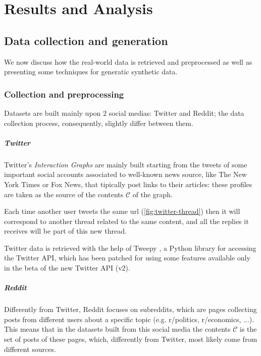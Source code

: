\chapter{Results and Analysis}
\label{ch:resultsAndAnalysis}

\section{Data collection and generation}%
\label{sec:data_collection_and_generation}

We now discuss how the real-world data is retrieved and preprocessed as well as
presenting some techniques for generatic synthetic data.

\subsection{Collection and preprocessing}%
\label{sub:collection_and_preprocessing}

Datasets are built mainly upon $2$ social medias: Twitter and Reddit; the data
collection process, consequently, slightly differ between them.

\paragraph{Twitter}%
\label{par:twitter-data}

Twitter's \emph{Interaction Graphs} are mainly built starting from the tweets
of some important social accounts associated to well-known news source, like The
New York Times or Fox News, that tipically post links to their articles:
these profiles are taken as the source of the contents $\mathcal{C} $ of the graph.

Each time another user tweets the same url (\autoref{fig:twitter-thread}) then
it will correspond to another thread related to the same content, and all the
replies it receives will be part of this new thread.

Twitter data is retrieved with the help of Tweepy \cite{tweepy}, a Python
library for accessing the Twitter API, which has been patched for using some
features available only in the beta of the new Twitter API (v2).

\paragraph{Reddit}%
\label{par:reddit}

Differently from Twitter, Reddit focuses on subreddits, which are pages
collecting posts from different users about a specific topic (e.g. r/politics,
r/economics, $\dots$). This means that
in the datasets built from this social media the contents $\mathcal{C} $ is the
set of posts of these pages, which, differently from Twitter, most likely
come from different sources.

